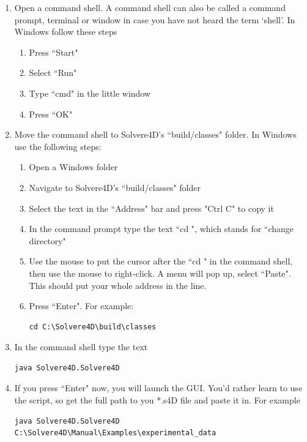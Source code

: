 \documentclass[singlecolumn,12pt]{article}
\begin{document}
\begin{enumerate}
\item Open a command shell. A command shell can also be called a command prompt,
terminal or window in case you have not heard the term `shell'. In Windows follow these steps
\begin{enumerate}
\item Press ``Start"
\item Select ``Run"
\item Type ``cmd" in the little window
\item Press ``OK"
\end{enumerate}

\item Move the command shell to Solvere4D's ``build/classes" folder.
In Windows use the following steps:
\begin{enumerate}
\item Open a Windows folder
\item Navigate to Solvere4D's ``build/classes" folder
\item Select the text in the ``Address" bar and press "Ctrl C" to
copy it
\item In the command prompt type the text ``cd ", which stands for
``change directory"
\item Use the mouse to put the cursor after the ``cd " in the
command shell, then use the mouse to right-click. A menu will pop
up, select ``Paste". This should put your whole address in the line.
\item Press ``Enter". For example:


\footnotesize
\begin{verbatim}
cd C:\Solvere4D\build\classes
\end{verbatim}
\normalsize


\end{enumerate}

\item In the command shell type the text

\footnotesize
\begin{verbatim}
java Solvere4D.Solvere4D
\end{verbatim}
\normalsize

\item If you press ``Enter" now, you will launch the GUI. You'd
rather learn to use the script, so get the full path to you *.s4D
file and paste it in. For example

\footnotesize
\begin{verbatim}
java Solvere4D.Solvere4D C:\Solvere4D\Manual\Examples\experimental_data
\end{verbatim}
\normalsize



\end{enumerate}
\end{document}
